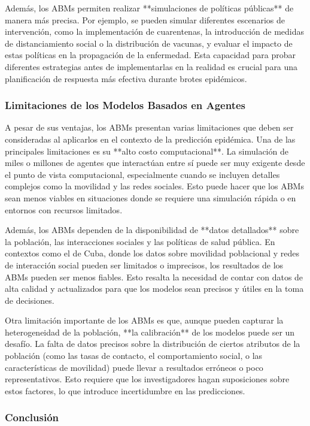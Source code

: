Además, los ABMs permiten realizar **simulaciones de políticas públicas** de manera más precisa. Por ejemplo, se pueden simular diferentes escenarios de intervención, como la implementación de cuarentenas, la introducción de medidas de distanciamiento social o la distribución de vacunas, y evaluar el impacto de estas políticas en la propagación de la enfermedad. Esta capacidad para probar diferentes estrategias antes de implementarlas en la realidad es crucial para una planificación de respuesta más efectiva durante brotes epidémicos.

\subsubsection{Limitaciones de los Modelos Basados en Agentes}

A pesar de sus ventajas, los ABMs presentan varias limitaciones que deben ser consideradas al aplicarlos en el contexto de la predicción epidémica. Una de las principales limitaciones es su **alto costo computacional**. La simulación de miles o millones de agentes que interactúan entre sí puede ser muy exigente desde el punto de vista computacional, especialmente cuando se incluyen detalles complejos como la movilidad y las redes sociales. Esto puede hacer que los ABMs sean menos viables en situaciones donde se requiere una simulación rápida o en entornos con recursos limitados.

Además, los ABMs dependen de la disponibilidad de **datos detallados** sobre la población, las interacciones sociales y las políticas de salud pública. En contextos como el de Cuba, donde los datos sobre movilidad poblacional y redes de interacción social pueden ser limitados o imprecisos, los resultados de los ABMs pueden ser menos fiables. Esto resalta la necesidad de contar con datos de alta calidad y actualizados para que los modelos sean precisos y útiles en la toma de decisiones.

Otra limitación importante de los ABMs es que, aunque pueden capturar la heterogeneidad de la población, **la calibración** de los modelos puede ser un desafío. La falta de datos precisos sobre la distribución de ciertos atributos de la población (como las tasas de contacto, el comportamiento social, o las características de movilidad) puede llevar a resultados erróneos o poco representativos. Esto requiere que los investigadores hagan suposiciones sobre estos factores, lo que introduce incertidumbre en las predicciones.

\subsubsection{Conclusión}

